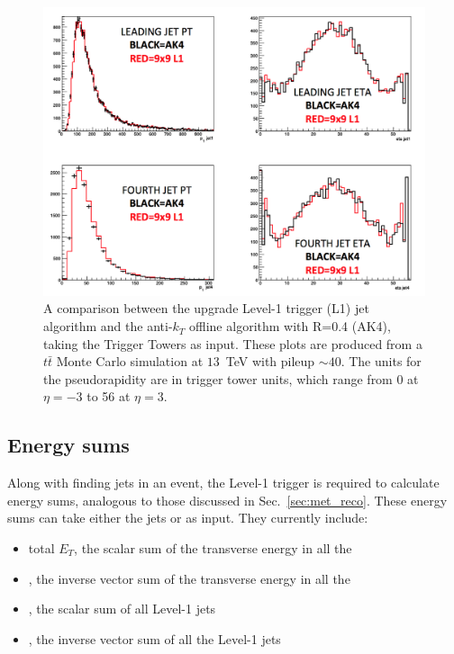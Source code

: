 \begin{figure}
	\begin{center}
		\includegraphics[width=1.0\linewidth]{figs/trigger/jet_l1s2_compak4}
	\end{center}
  \caption{A comparison between the upgrade Level-1 trigger (L1) jet
  algorithm and the anti-$k_T$ offline algorithm with R=0.4 
  (AK4), taking
  the Trigger Towers as input.  These plots are produced from a
  $t\bar{t}$ Monte Carlo simulation at $13$~TeV with pileup $\sim40$.
  The units for the pseudorapidity are in trigger tower units, which
  range from 0 at $\eta =-3$ to 56 at $\eta=3$.}
	\label{fig:ak4_comp}
\end{figure}

\subsection{Energy sums}

Along with finding jets in an event, the Level-1 trigger is required
to calculate energy sums, analogous to those discussed in
Sec.~\ref{sec:met_reco}.  These energy sums can take either the jets
or \TT as input. They currently include:
\begin{itemize}
\item{total $E_T$, the scalar sum of the transverse energy in all the \TT}
\item{\met, the inverse vector sum of the transverse energy in all the
\TT}
\item{\ht, the scalar sum of all Level-1 jets}
\item{\mht, the inverse vector sum of all the Level-1 jets}
\end{itemize}

